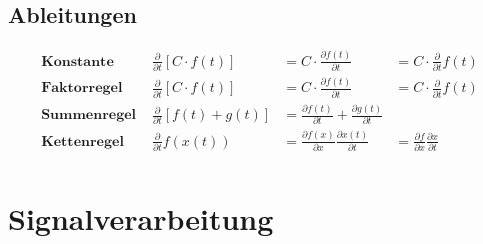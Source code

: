 \documentclass[8pt]{article}
\begin{document}
		\subsection{Ableitungen}
			\begin{align*}
				\textbf{Konstante } 	& \frac{\partial}{\partial t} [C \cdot f(t)] & = C \cdot \frac{\partial f(t)}{\partial t} & = C \cdot \frac{\partial}{\partial t} f(t)\\
				\textbf{Faktorregel } 	& \frac{\partial}{\partial t} [C \cdot f(t)] & = C \cdot \frac{\partial f(t)}{\partial t} & = C \cdot \frac{\partial}{\partial t} f(t)\\
				\textbf{Summenregel } 	& \frac{\partial}{\partial t} [f(t) + g(t)] & = \frac{\partial f(t)}{\partial t} + \frac{\partial g(t)}{\partial t} & \\
				\textbf{Kettenregel } 	& \frac{\partial}{\partial t} f(x(t)) & = \frac{\partial f(x)}{\partial x} \frac{\partial x(t)}{\partial t} & = \frac{\partial f}{\partial x}\frac{\partial x}{\partial t}\\
			\end{align*}
	\section{Signalverarbeitung}
\end{document}
